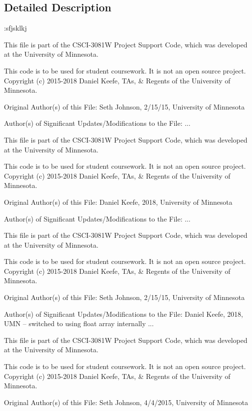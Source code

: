 \subsection{Detailed Description}
\+:sfjsklkj 

This file is part of the C\+S\+C\+I-\/3081W Project Support Code, which was developed at the University of Minnesota.

This code is to be used for student coursework. It is not an open source project. Copyright (c) 2015-\/2018 Daniel Keefe, T\+As, \& Regents of the University of Minnesota.

Original Author(s) of this File\+: Seth Johnson, 2/15/15, University of Minnesota

Author(s) of Significant Updates/\+Modifications to the File\+: ...

This file is part of the C\+S\+C\+I-\/3081W Project Support Code, which was developed at the University of Minnesota.

This code is to be used for student coursework. It is not an open source project. Copyright (c) 2015-\/2018 Daniel Keefe, T\+As, \& Regents of the University of Minnesota.

Original Author(s) of this File\+: Daniel Keefe, 2018, University of Minnesota

Author(s) of Significant Updates/\+Modifications to the File\+: ...

This file is part of the C\+S\+C\+I-\/3081W Project Support Code, which was developed at the University of Minnesota.

This code is to be used for student coursework. It is not an open source project. Copyright (c) 2015-\/2018 Daniel Keefe, T\+As, \& Regents of the University of Minnesota.

Original Author(s) of this File\+: Seth Johnson, 2/15/15, University of Minnesota

Author(s) of Significant Updates/\+Modifications to the File\+: Daniel Keefe, 2018, U\+MN -- switched to using float array internally ...

This file is part of the C\+S\+C\+I-\/3081W Project Support Code, which was developed at the University of Minnesota.

This code is to be used for student coursework. It is not an open source project. Copyright (c) 2015-\/2018 Daniel Keefe, T\+As, \& Regents of the University of Minnesota.

Original Author(s) of this File\+: Seth Johnson, 4/4/2015, University of Minnesota

